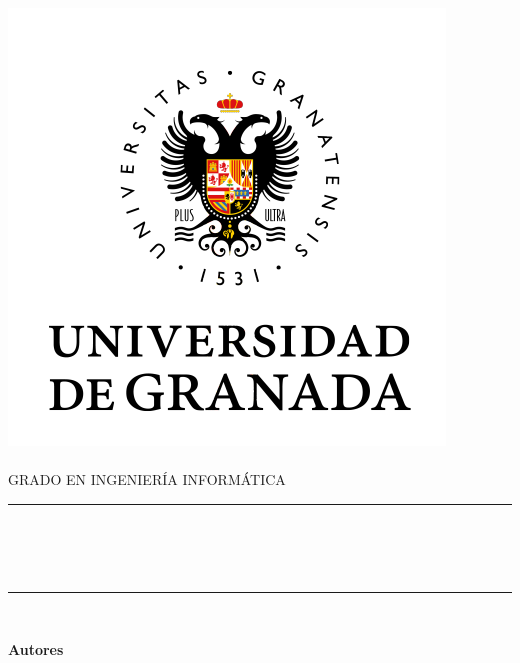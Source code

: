 
\begin{titlepage}
    \begin{minipage}{\textwidth}
        \centering

        \includegraphics[scale=0.5]{images/ugr.png}\\

        \textsc{\Large \asignatura{}\\[0.2cm]}
        \textsc{GRADO EN INGENIERÍA INFORMÁTICA}\\[1cm]

        \noindent\rule[-1ex]{\textwidth}{1pt}\\[1.5ex]
        \textsc{{\Huge \titulo\\[0.5ex]}}
        \textsc{{\Large \subtitulo\\}}
        \noindent\rule[-1ex]{\textwidth}{2pt}\\[2.5ex]

        \end{minipage}

        \vspace{0.3cm}

        \begin{minipage}{\textwidth}

        \centering

        \textbf{Autores}\\ {\autor{}}\\[1.5ex]
        \vspace{0.2cm}


\end{minipage}
\end{titlepage}
